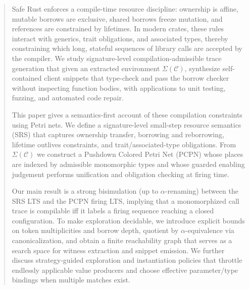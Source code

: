 \documentclass[runningheads]{llncs}
\begin{document}
\begin{abstract}
Safe Rust enforces a compile-time resource discipline: ownership is affine, mutable borrows are exclusive, shared borrows freeze mutation, and references are constrained by lifetimes. In modern crates, these rules interact with generics, trait obligations, and associated types, thereby constraining which long, stateful
sequences of library calls are accepted by the compiler. We study signature-level compilation-admissible trace generation that given an extracted environment $\Sigma(\mathcal{C})$, synthesize self-contained client snippets that type-check and pass the borrow checker without inspecting function bodies, with applications to unit testing, fuzzing, and automated code repair.

This paper gives a semantics-first account of these compilation constraints using Petri nets. We define a signature-level small-step resource semantics (SRS) that captures ownership transfer, borrowing and reborrowing, lifetime outlives constraints, and trait/associated-type obligations. From $\Sigma(\mathcal{C})$ we construct a Pushdown Colored Petri Net (PCPN) whose places are indexed by admissible monomorphic types and whose guarded enabling judgement performs unification and obligation checking at firing time.

Our main result is a strong bisimulation (up to $\alpha$-renaming) between the SRS LTS and the PCPN firing LTS, implying that a monomorphized call trace is compilable iff it labels a firing sequence reaching a closed configuration.
To make exploration decidable, we introduce explicit bounds on token multiplicities and borrow depth, quotient by $\alpha$-equivalence via canonicalization, and obtain a finite reachability graph that serves as a search space for witness extraction and snippet emission. We further discuss strategy-guided exploration and instantiation policies that throttle endlessly applicable value producers and choose effective parameter/type bindings when multiple matches exist.
\end{abstract}
\end{document}
